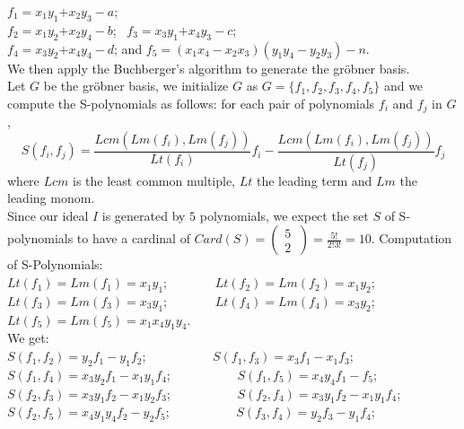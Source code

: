 \documentclass[sigconf,balance=false]{acmart}
\begin{document}
 $f_{1}=x_{1}y_{1} \text{+} x_{2}y_{3}-a$;\\ $f_{2}=x_{1}y_{2} \text{+} x_{2}y_{4}-b$; \ $f_{3}=x_{3}y_{1} \text{+} x_{4}y_{3}-c$;\\ $f_{4}=x_{3}y_{2} \text{+} x_{4}y_{4}-d$; and $f_{5}=\left(x_{1}x_{4}-x_{2}x_{3}\right)\left(y_{1}y_{4}-y_{2}y_{3}\right)-n$.\\
We then apply the Buchberger's algorithm to generate the gröbner basis.\\
Let $G$ be the gröbner basis, we initialize $G$ as $G=\displaystyle\lbrace f_{1}, f_{2}, f_{3}, f_{4}, f_{5}\rbrace$ and we compute the S-polynomials as follows: for each pair of polynomials $f_{i}$ and $f_{j}$ in $G$, 
$$S\displaystyle\left(f_{i}, f_{j}\right)=\frac{Lcm\left(Lm(f_{i}), Lm(f_{j}) \right)}{Lt(f_{i})}f_{i}-\frac{Lcm\left(Lm(f_{i}), Lm(f_{j}) \right)}{Lt(f_{j})}f_{j}$$
 where $Lcm$ is the least common multiple, $Lt$ the leading term and $Lm$ the leading monom.\\
Since our ideal $I$ is generated by $5$ polynomials, we expect the set $S$ of S-polynomials to have a cardinal of $Card\left(S\right)\displaystyle= \begin{pmatrix}
5 \ \\ 
2 \
\end{pmatrix}=\frac{5!}{2!3!}=10$.
Computation of S-Polynomials:\\
$Lt(f_{1})=Lm(f_{1})=x_{1}y_{1}$; \ \ \ \ \ \ \ $Lt(f_{2})=Lm(f_{2})=x_{1}y_{2}$;\\ $Lt(f_{3})=Lm(f_{3})=x_{3}y_{1}$; \ \ \ \ \ \ \ 
$Lt(f_{4})=Lm(f_{4})=x_{3}y_{2}$;\\
$Lt(f_{5})=Lm(f_{5})=x_{1}x_{4}y_{1}y_{4}$.\\
We get:\\
$S\displaystyle\left(f_{1}, f_{2}\right)=y_{2}f_{1}-y_{1}f_{2}$; \ \ \ \ \ \ \ \ \ \
$S\displaystyle\left(f_{1}, f_{3}\right)=x_{3}f_{1}-x_{1}f_{3}$; \\

$S\displaystyle\left(f_{1}, f_{4}\right)=x_{3}y_{2}f_{1}-x_{1}y_{1}f_{4}$; \ \ \ \ \ \ \ \ \ \
$S\displaystyle\left(f_{1}, f_{5}\right)=x_{4}y_{4}f_{1}-f_{5}$; \\

$S\displaystyle\left(f_{2}, f_{3}\right)=x_{3}y_{1}f_{2}-x_{1}y_{2}f_{3}$;  \ \ \ \ \ \ \ \ \ \
$S\displaystyle\left(f_{2}, f_{4}\right)=x_{3}y_{1}f_{2}-x_{1}y_{1}f_{4}$; \\


$S\displaystyle\left(f_{2}, f_{5}\right)=x_{4}y_{1}y_{4}f_{2}-y_{2}f_{5}$; \ \ \ \ \ \ \ \ \ \
$S\displaystyle\left(f_{3}, f_{4}\right)=y_{2}f_{3}-y_{1}f_{4}$; \\
\end{document}
